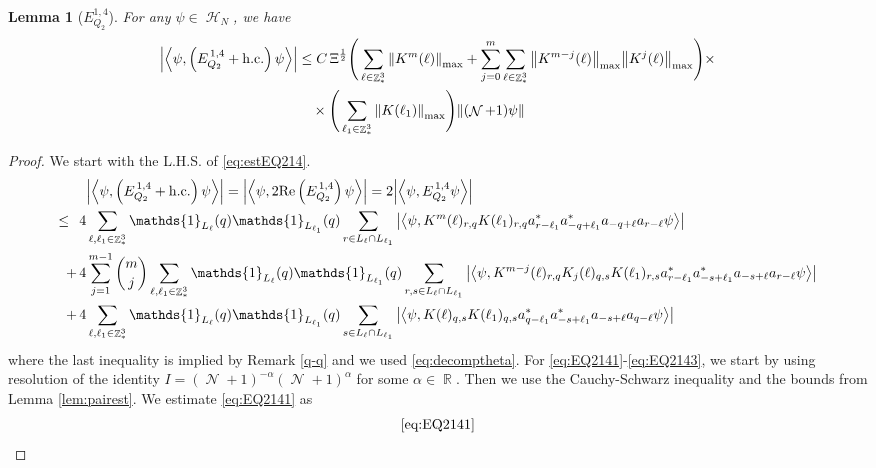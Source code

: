 \documentclass[sn-mathphys, Numbered ,a4paper]{sn-jnl}%
\DeclareMathOperator{\R}{\mathbb{R}}
\DeclareMathOperator{\Z}{\mathbb{Z}}
\DeclareMathOperator{\HH}{\mathcal{H}}
\DeclareMathOperator{\NN}{\mathcal{N}}
\newcommand{\half}{\frac{1}{2}}
\newcommand{\eva}[1]{\left\langle #1 \right\rangle}
\theoremstyle{plain}
\newtheorem{lemma}[theorem]{Lemma}
\theoremstyle{definition}
\theoremstyle{remark}
\theoremstyle{plain}
\theoremstyle{definition}
\theoremstyle{remark}
\begin{document}
\begin{lemma}[$E_{Q_2}^{1,4}$]
	For any $\psi \in \HH_N$, we have
	\begin{align}
		\abs{\eva{\psi,\left(E^{\,1,4}_{Q_2}+\mathrm{h.c.}\right) \psi }}
		&\leq  C\, \Xi^{\half} \Bigg(\sum\limits_{\ell \in \Z^3_*} \norm{K^m(\ell)}_{\mathrm{max}} + \sum\limits_{j=0}^m \sum\limits_{\ell \in \Z^3_*}\norm{K^{m-j}(\ell)}_{\mathrm{max}}\norm{K^{j}(\ell)}_{\mathrm{max}}\Bigg)\times\nonumber\\&\quad\times \Bigg( \sum\limits_{\ell_1 \in \Z^3_*}\norm{K(\ell_1)}_{\mathrm{max}} \Bigg)  \norm { (\NN+1) \psi }   \label{eq:estEQ214}
	\end{align}
\end{lemma}
\begin{proof}
	We start with the L.H.S. of \eqref{eq:estEQ214}.
	\begin{align}
		&\abs{\eva{\psi,\left(E^{\,1,4}_{Q_2}+\mathrm{h.c.}\right) \psi }} = \abs{\eva{\psi,2\mathrm{Re}\left(E^{\,1,4}_{Q_2}\right) \psi }} = 2\abs{\eva{\psi, E^{\,1,4}_{Q_2} \psi }}\nonumber\\
		\leq\,\;4& \sum\limits_{\ell, \ell_1\in \Z^3_*} \mathds{1}_{L_{\ell}}(q) \mathds{1}_{L_{\ell_1}}(q) \sum\limits_{r\in L_{\ell} \cap L_{\ell_1}} \abs{\eva{\psi,  K^m(\ell)_{r,q}K(\ell_1)_{r,q}a^*_{r-\ell_1}a^*_{-q+\ell_1} a_{-q+\ell}a_{r-\ell} \psi }}\label{eq:EQ2141}\\
		+\,4& \sum\limits_{j=1}^{m-1} {{m}\choose j} \sum\limits_{\ell, \ell_1\in \Z^3_*}\mathds{1}_{L_{\ell}}(q) \mathds{1}_{L_{\ell_1}}(q) \sum\limits_{r,s \in L_{\ell} \cap L_{\ell_1}}  \abs{\eva{\psi, K^{m-j}(\ell)_{r,q} K_{j}(\ell)_{q,s} K(\ell_1)_{r,s} a^*_{r-\ell_1} a^*_{-s+\ell_1} a_{-s+\ell} a_{r-\ell} \psi }} \label{eq:EQ2142}\\
		+\,4&\sum\limits_{\ell, \ell_1\in \Z^3_*} \mathds{1}_{L_{\ell}}(q) \mathds{1}_{L_{\ell_1}}(q) \sum\limits_{s \in L_{\ell} \cap L_{\ell_1}} \abs{\eva{\psi,  K(\ell)_{q,s}K(\ell_1)_{q,s}a^*_{q-\ell_1}a^*_{-s+\ell_1} a_{-s+\ell}a_{q-\ell} \psi }}\label{eq:EQ2143}
	\end{align}
	where the last inequality is implied by Remark \ref{q-q} and we used \eqref{eq:decomptheta}.
	For \eqref{eq:EQ2141}-\eqref{eq:EQ2143}, we start by using resolution of the identity $I = (\NN+1)^{-\alpha}(\NN+1)^{\alpha}$ for some $\alpha \in \R$. Then we use the Cauchy-Schwarz inequality and the bounds from Lemma \ref{lem:pairest}.
	We estimate \eqref{eq:EQ2141} as 
	\begin{align}
		&\eqref{eq:EQ2141}\nonumber\\

\end{align}
\end{proof}
\end{document}
